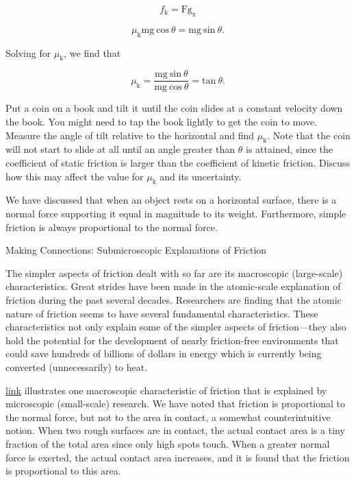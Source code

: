 \documentclass[
]{book}
\begin{document}
\leavevmode{}%
\[{f_{\text{k}} = \text{Fg}_{\text{x}}}{}\]

\leavevmode{}%
\[{{\mu_{\text{k}}\text{mg}\ \text{cos}\ {\theta = \text{mg}}\ \text{sin}\ \theta}.}{}\]

Solving for \(\mu_{\text{k}}{}\), we find that

\leavevmode{}%
\[{{{{\mu_{\text{k}} = \frac{\text{mg}\ \text{sin}\ \theta}{\text{mg}\ \text{cos}\ \theta}} = \text{tan}}\ \theta}.}{}\]

Put a coin on a book and tilt it until the coin slides at a constant
velocity down the book. You might need to tap the book lightly to get
the coin to move. Measure the angle of tilt relative to the horizontal
and find \(\mu_{\text{k}}{}\). Note that the coin will not start to slide
at all until an angle greater than \(\theta\) is attained, since the
coefficient of static friction is larger than the coefficient of kinetic
friction. Discuss how this may affect the value for \(\mu_{\text{k}}{}\)
and its uncertainty.

We have discussed that when an object rests on a horizontal surface,
there is a normal force supporting it equal in magnitude to its weight.
Furthermore, simple friction is always proportional to the normal force.

\hypertarget{fs-id1529687}{}
Making Connections: Submicroscopic Explanations of Friction

The simpler aspects of friction dealt with so far are its macroscopic
(large-scale) characteristics. Great strides have been made in the
atomic-scale explanation of friction during the past several decades.
Researchers are finding that the atomic nature of friction seems to have
several fundamental characteristics. These characteristics not only
explain some of the simpler aspects of friction---they also hold the
potential for the development of nearly friction-free environments that
could save hundreds of billions of dollars in energy which is currently
being converted (unnecessarily) to heat.

\protect\hyperlink{import-auto-id1165298530900}{link} illustrates
one macroscopic characteristic of friction that is explained by
microscopic (small-scale) research. We have noted that friction is
proportional to the normal force, but not to the area in contact, a
somewhat counterintuitive notion. When two rough surfaces are in
contact, the actual contact area is a tiny fraction of the total area
since only high spots touch. When a greater normal force is exerted, the
actual contact area increases, and it is found that the friction is
proportional to this area.
\end{document}

